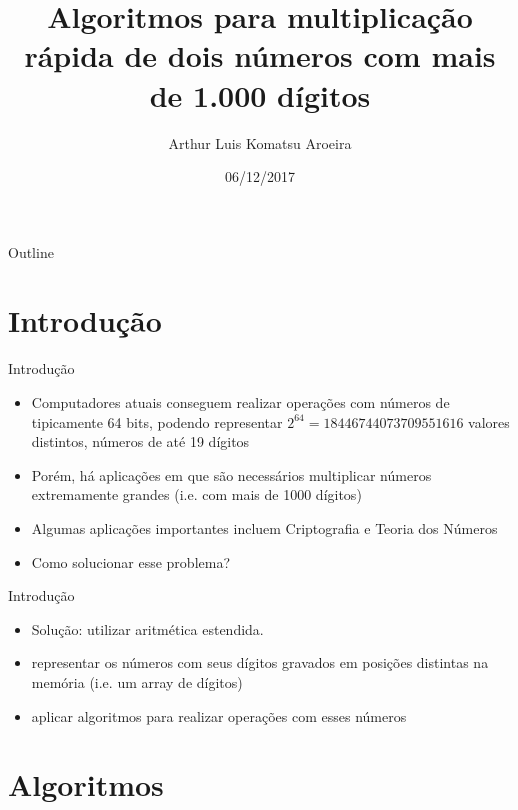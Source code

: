 \documentclass{beamer}
\title[Your Short Title]{Algoritmos para multiplicação rápida de dois números com mais de 1.000 dígitos}
\author{Arthur Luis Komatsu Aroeira}
\institute{Universidade de Brasilia - Faculdade Gama}
\date{06/12/2017}
\begin{document}
\begin{frame}
  \titlepage
\end{frame}

\begin{frame}{Outline}
 \tableofcontents
\end{frame}

\section{Introdução}

\begin{frame}{Introdução}

\begin{itemize}
  \item Computadores atuais conseguem realizar operações com números de tipicamente 64 bits, podendo representar $2^{64}=18446744073709551616$ valores distintos, números de até 19 dígitos
  \item Porém, há aplicações em que são necessários multiplicar números extremamente grandes (i.e. com mais de 1000 dígitos)
  \item Algumas aplicações importantes incluem Criptografia e Teoria dos Números
  \item Como solucionar esse problema?
\end{itemize}



\end{frame}

\begin{frame}{Introdução}
	\begin{itemize}
		\item Solução: utilizar aritmética estendida.
		\item representar os números com seus dígitos gravados em posições distintas na memória (i.e. um array de dígitos)
		\item aplicar algoritmos para realizar operações com esses números
	\end{itemize}
\end{frame}

\section{Algoritmos}
\end{document}
